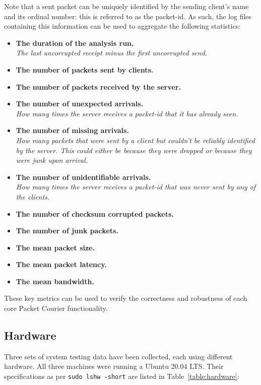 Note that a sent packet can be uniquely identified by the sending client's name and its ordinal number: this is
referred to as the packet-id. As such, the log files containing this information can be used to aggregate the
following statistics:
\begin{itemize}
    \item \textbf{The duration of the analysis run.} \\
    \emph{The last uncorrupted receipt minus the first uncorrupted send.}
    \item \textbf{The number of packets sent by clients.}
    \item \textbf{The number of packets received by the server.}
    \item \textbf{The number of unexpected arrivals.} \\
    \emph{How many times the server receives a packet-id that it has already seen.}
    \item \textbf{The number of missing arrivals.} \\
    \emph{How many packets that were sent by a client but couldn't be reliably identified by the server. This could
    either be because they were dropped or because they were junk upon arrival.}
    \item \textbf{The number of unidentifiable arrivals.} \\
    \emph{How many times the server receives a packet-id that was never sent by any of the clients.}
    \item \textbf{The number of checksum corrupted packets.}
    \item \textbf{The number of junk packets.}
    \item \textbf{The mean packet size.}
    \item \textbf{The mean packet latency.}
    \item \textbf{The mean bandwidth.}
\end{itemize}

These key metrics can be used to verify the correctness and robustness of each core Packet Courier functionality.

\subsection{Hardware}\label{subsection:hardware}

Three sets of system testing data have been collected, each using different hardware. All three machines were running
a Ubuntu 20.04 LTS\cite{ubuntu_20_04}. Their specifications as per \texttt{sudo lshw -short} are listed in
Table~\ref{table:hardware}:

